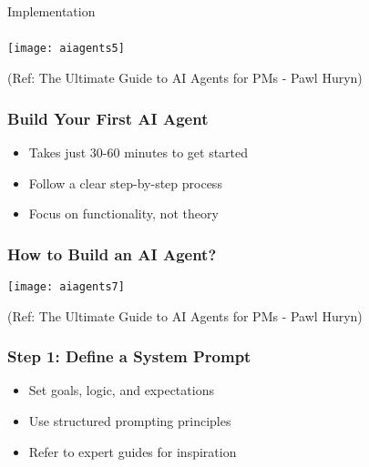 \begin{frame}[fragile]\frametitle{}
\begin{center}
{\Large Implementation}
\end{center}
\end{frame}


\begin{frame}[fragile]\frametitle{}

\begin{center}
\texttt{[image: aiagents5]}

{\tiny (Ref: The Ultimate Guide to AI Agents for PMs - Pawl Huryn)}
\end{center}	
  
\end{frame}

\begin{frame}[fragile]\frametitle{Build Your First AI Agent}
      \begin{itemize}
        \item Takes just 30-60 minutes to get started
        \item Follow a clear step-by-step process
        \item Focus on functionality, not theory
      \end{itemize}
\end{frame}

\begin{frame}[fragile]\frametitle{How to Build an AI Agent?}

	\begin{center}
	\texttt{[image: aiagents7]}
	\end{center}
	
	{\tiny (Ref: The Ultimate Guide to AI Agents for PMs - Pawl Huryn)}
\end{frame}


\begin{frame}[fragile]\frametitle{Step 1: Define a System Prompt}
      \begin{itemize}
        \item Set goals, logic, and expectations
        \item Use structured prompting principles
        \item Refer to expert guides for inspiration
      \end{itemize}
\end{frame}

